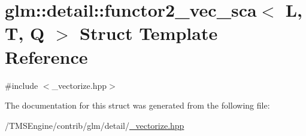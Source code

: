 \hypertarget{structglm_1_1detail_1_1functor2__vec__sca}{}\section{glm\+:\+:detail\+:\+:functor2\+\_\+vec\+\_\+sca$<$ L, T, Q $>$ Struct Template Reference}
\label{structglm_1_1detail_1_1functor2__vec__sca}


{\ttfamily \#include $<$\+\_\+vectorize.\+hpp$>$}



The documentation for this struct was generated from the following file\+:\begin{DoxyCompactItemize}
\item 
/\+T\+M\+S\+Engine/contrib/glm/detail/\hyperlink{__vectorize_8hpp}{\+\_\+vectorize.\+hpp}\end{DoxyCompactItemize}

